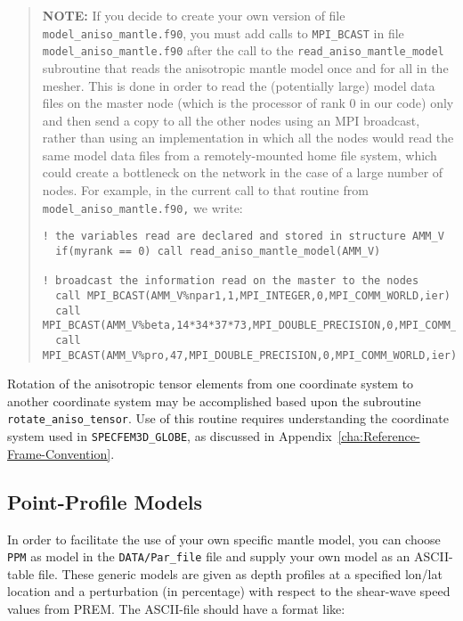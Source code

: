 \begin{quote}
\textbf{NOTE:} If you decide to create your own version of file \texttt{model\_aniso\_mantle.f90},
you must add calls to \texttt{MPI\_BCAST} in file \texttt{model\_aniso\_mantle.f90}
after the call to the \texttt{read\_aniso\_mantle\_model} subroutine
that reads the anisotropic mantle model once and for all in the mesher.
This is done in order to read the (potentially large) model data files
on the master node (which is the processor of rank 0 in our code)
only and then send a copy to all the other nodes using an MPI broadcast,
rather than using an implementation in which all the nodes would read
the same model data files from a remotely-mounted home file system,
which could create a bottleneck on the network in the case of a large
number of nodes. For example, in the current call to that routine
from \texttt{model\_aniso\_mantle.f90,} we write:

{\footnotesize
\begin{verbatim}
! the variables read are declared and stored in structure AMM_V
  if(myrank == 0) call read_aniso_mantle_model(AMM_V)

! broadcast the information read on the master to the nodes
  call MPI_BCAST(AMM_V%npar1,1,MPI_INTEGER,0,MPI_COMM_WORLD,ier)
  call MPI_BCAST(AMM_V%beta,14*34*37*73,MPI_DOUBLE_PRECISION,0,MPI_COMM_WORLD,ier)
  call MPI_BCAST(AMM_V%pro,47,MPI_DOUBLE_PRECISION,0,MPI_COMM_WORLD,ier)
\end{verbatim}
}
\end{quote}

Rotation of the anisotropic tensor elements from one coordinate system
to another coordinate system may be accomplished based upon the subroutine
\texttt{rotate\_aniso\_tensor}. Use of this routine requires understanding
the coordinate system used in \texttt{SPECFEM3D\_GLOBE}, as discussed
in Appendix~\ref{cha:Reference-Frame-Convention}.


\subsection{Point-Profile Models}\label{sub:Point-Profile-Models}

In order to facilitate the use of your own specific mantle model, you can choose \texttt{PPM} as model in the \texttt{DATA/Par\_file} file
and supply your own model as an ASCII-table file. These generic models are given as depth profiles at a specified lon/lat location
and a perturbation (in percentage) with respect to the shear-wave speed values from PREM. The ASCII-file should have a format like:

